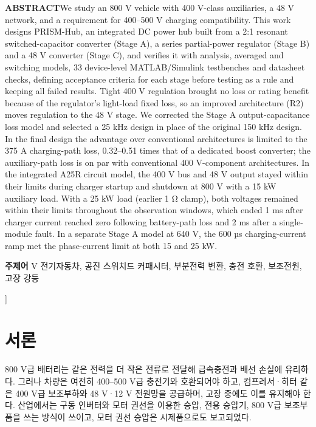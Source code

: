 \documentclass[10pt,a4paper,twocolumn]{article}
\begin{document}
{\begin{center}
\begin{minipage}{0.92\textwidth}
\vspace{1.5mm}
\textbf{ABSTRACT}\quad We study an 800 V vehicle with 400 V-class auxiliaries, a 48 V network, and a requirement for 400–500 V charging compatibility. This work designs PRISM-Hub, an integrated DC power hub built from a 2:1 resonant switched-capacitor converter (Stage A), a series partial-power regulator (Stage B) and a 48 V converter (Stage C), and verifies it with analysis, averaged and switching models, 33 device-level MATLAB/Simulink testbenches and datasheet checks, defining acceptance criteria for each stage before testing as a rule and keeping all failed results. Tight 400 V regulation brought no loss or rating benefit because of the regulator's light-load fixed loss, so an improved architecture (R2) moves regulation to the 48 V stage. We corrected the Stage A output-capacitance loss model and selected a 25 kHz design in place of the original 150 kHz design. In the final design the advantage over conventional architectures is limited to the 375 A charging-path loss, 0.32–0.51 times that of a dedicated boost converter; the auxiliary-path loss is on par with conventional 400 V-component architectures. In the integrated A25R circuit model, the 400 V bus and 48 V output stayed within their limits during charger startup and shutdown at 800 V with a 15 kW auxiliary load. With a 25 kW load (earlier 1 Ω clamp), both voltages remained within their limits throughout the observation windows, which ended 1 ms after charger current reached zero following battery-path loss and 2 ms after a single-module fault. In a separate Stage A model at 640 V, the 600 µs charging-current ramp met the phase-current limit at both 15 and 25 kW.

\vspace{1.5mm}
\textbf{주제어} V 전기자동차, 공진 스위치드 커패시터, 부분전력 변환, 충전 호환, 보조전원, 고장 강등
\end{minipage}
\end{center}
\vspace{4mm}
}]

\section{서론}

800 V급 배터리는 같은 전력을 더 작은 전류로 전달해 급속충전과 배선 손실에 유리하다\cite{r1}. 그러나 차량은 여전히 400–500 V급 충전기와 호환되어야 하고, 컴프레서·히터 같은 400 V급 보조부하와 48 V·12 V 전원망을 공급하며\cite{r10,r13}, 고장 중에도 이를 유지해야 한다. 산업에서는 구동 인버터와 모터 권선을 이용한 승압\cite{r2}, 전용 승압기\cite{r4,r5}, 800 V급 보조부품을 쓰는 방식이 쓰이고, 모터 권선 승압은 시제품으로도 보고되었다\cite{r3}.
\end{document}
